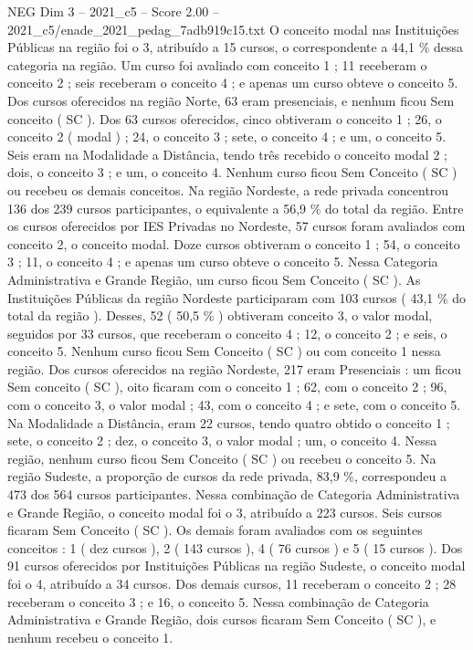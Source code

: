 \begin{textsample}{NEG Dim 3 – 2021\_c5 – Score 2.00 – 2021\_c5/enade\_2021\_pedag\_7adb919c15.txt}
O conceito modal nas Instituições Públicas na região foi o 3, atribuído a 15 cursos, o correspondente a 44,1 \% dessa categoria na região.
Um curso foi avaliado com conceito 1 ; 11 receberam o conceito 2 ; seis receberam o conceito 4 ; e apenas um curso obteve o conceito 5.
Dos cursos oferecidos na região Norte, 63 eram presenciais, e nenhum ficou Sem conceito ( SC ).
Dos 63 cursos oferecidos, cinco obtiveram o conceito 1 ; 26, o conceito 2 ( modal ) ; 24, o conceito 3 ; sete, o conceito 4 ; e um, o conceito 5.
Seis eram na Modalidade a Distância, tendo três recebido o conceito modal 2 ; dois, o conceito 3 ; e um, o conceito 4.
Nenhum curso ficou Sem Conceito ( SC ) ou recebeu os demais conceitos.
Na região Nordeste, a rede privada concentrou 136 dos 239 cursos participantes, o equivalente a 56,9 \% do total da região.
Entre os cursos oferecidos por IES Privadas no Nordeste, 57 cursos foram avaliados com conceito 2, o conceito modal.
Doze cursos obtiveram o conceito 1 ; 54, o conceito 3 ; 11, o conceito 4 ; e apenas um curso obteve o conceito 5.
Nessa Categoria Administrativa e Grande Região, um curso ficou Sem Conceito ( SC ).
As Instituições Públicas da região Nordeste participaram com 103 cursos ( 43,1 \% do total da região ).
Desses, 52 ( 50,5 \% ) obtiveram conceito 3, o valor modal, seguidos por 33 cursos, que receberam o conceito 4 ; 12, o conceito 2 ; e seis, o conceito 5.
Nenhum curso ficou Sem Conceito ( SC ) ou com conceito 1 nessa região.
Dos cursos oferecidos na região Nordeste, 217 eram Presenciais : um ficou Sem conceito ( SC ), oito ficaram com o conceito 1 ; 62, com o conceito 2 ; 96, com o conceito 3, o valor modal ; 43, com o conceito 4 ; e sete, com o conceito 5.
Na Modalidade a Distância, eram 22 cursos, tendo quatro obtido o conceito 1 ; sete, o conceito 2 ; dez, o conceito 3, o valor modal ; um, o conceito 4.
Nessa região, nenhum curso ficou Sem Conceito ( SC ) ou recebeu o conceito 5.
Na região Sudeste, a proporção de cursos da rede privada, 83,9 \%, correspondeu a 473 dos 564 cursos participantes.
Nessa combinação de Categoria Administrativa e Grande Região, o conceito modal foi o 3, atribuído a 223 cursos.
Seis cursos ficaram Sem Conceito ( SC ).
Os demais foram avaliados com os seguintes conceitos : 1 ( dez cursos ), 2 ( 143 cursos ), 4 ( 76 cursos ) e 5 ( 15 cursos ).
Dos 91 cursos oferecidos por Instituições Públicas na região Sudeste, o conceito modal foi o 4, atribuído a 34 cursos.
Dos demais cursos, 11 receberam o conceito 2 ; 28 receberam o conceito 3 ; e 16, o conceito 5.
Nessa combinação de Categoria Administrativa e Grande Região, dois cursos ficaram Sem Conceito ( SC ), e nenhum recebeu o conceito 1.

\end{textsample}

